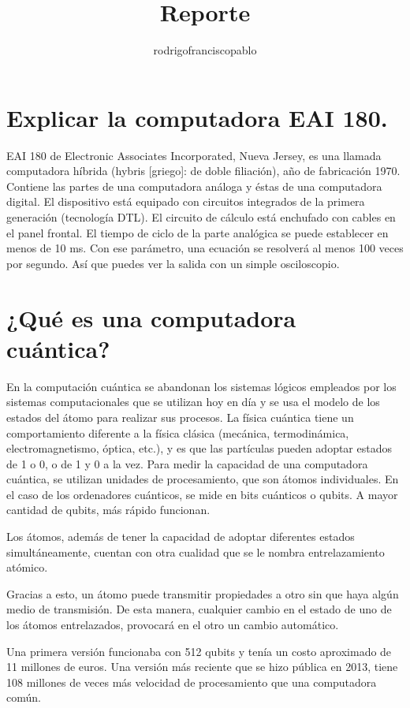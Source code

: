 \documentclass{mylib/reporte}
\title{Reporte}
\author{rodrigofranciscopablo }
\begin{document}
\coverPage

\tableofcontents

\section{Explicar la computadora EAI 180.}
EAI 180 de Electronic Associates Incorporated, Nueva Jersey, es una llamada computadora híbrida (hybris [griego]: de doble filiación), año de fabricación 1970. Contiene las partes de una computadora análoga y éstas de una computadora digital. El dispositivo está equipado con circuitos integrados de la primera generación (tecnología DTL). El circuito de cálculo está enchufado con cables en el panel frontal. El tiempo de ciclo de la parte analógica se puede establecer en menos de 10 ms. Con ese parámetro, una ecuación se resolverá al menos 100 veces por segundo. Así que puedes ver la salida con un simple osciloscopio.

\section{¿Qué es una computadora cuántica?}

En la computación cuántica se abandonan los sistemas lógicos empleados por los sistemas computacionales que se utilizan hoy en día y se usa el modelo de los estados del átomo para realizar sus procesos.
La física cuántica tiene un comportamiento diferente a la física clásica (mecánica, termodinámica, electromagnetismo, óptica, etc.), y es que las partículas pueden adoptar estados de 1 o 0, o de 1 y 0 a la vez.
Para medir la capacidad de una computadora cuántica, se utilizan unidades de procesamiento, que son átomos individuales. En el caso de los ordenadores cuánticos, se mide en bits cuánticos o qubits. A mayor cantidad de qubits, más rápido funcionan.

Los átomos, además de tener la capacidad de adoptar diferentes estados simultáneamente, cuentan con otra cualidad que se le nombra entrelazamiento atómico.

Gracias a esto, un átomo puede transmitir propiedades a otro sin que haya algún medio de transmisión. De esta manera, cualquier cambio en el estado de uno de los átomos entrelazados, provocará en el otro un cambio automático.

Una primera versión funcionaba con 512 qubits y tenía un costo aproximado de 11 millones de euros. Una versión más reciente que se hizo pública en 2013, tiene 108 millones de veces más velocidad de procesamiento que una computadora común.
\end{document}
